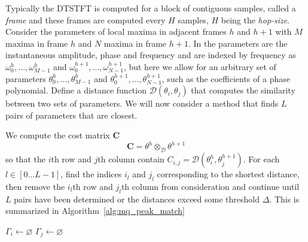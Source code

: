 Typically the DTSTFT is computed for a block of contiguous samples, called a
\textit{frame} and these frames are computed every $H$ samples, $H$ being the
\textit{hop-size}. Consider the parameters of local maxima in adjacent frames
$h$ and $h+1$ with $M$ maxima in frame $h$ and $N$ maxima in frame $h+1$. In
\cite{mcaulay1986speech}  the parameters are the instantaneous amplitude, phase
and frequency and are indexed by frequency as $\omega_0^{h}, \dotsc,
\omega_{M-1}^{h}$ and $\omega_0^{h+1}, \dotsc, \omega_{N-1}^{h+1}$, but here we
allow for an arbitrary set of parameters $\theta_0^{h}, \dotsc,
\theta_{M-1}^{h}$ and $\theta_0^{h+1}, \dotsc,
\theta_{N-1}^{h+1}$, such as the coefficients of a phase polynomial. Define a
distance function $\mathcal{D} \left( \theta_{i},\theta_{j} \right)$ that computes the
similarity between two sets of parameters. We will now consider a method that
finds $L$ pairs of parameters that are closest.

We compute the cost matrix $\boldsymbol{C}$
\[
    \boldsymbol{C} = \theta^{h} \otimes_{\mathcal{D}} \theta^{h+1}
\]
so that the $i$th row and $j$th column contain $C_{i,j} = \mathcal{D} \left(
\theta_{i}^{h},\theta_{j}^{h+1} \right)$.  For each $l \in \left[0 \dotsc L-1
\right]$, find the indices $i_{l}$ and $j_{l}$ corresponding to the shortest
distance, then remove the $i_{l}$th row and $j_{l}$th column from consideration
and continue until $L$ pairs have been determined or the distances exceed some
threshold $\Delta$. This is summarized in Algorithm~\ref{alg:mq_peak_match}

\begin{algorithm}[H]
    \caption{\label{alg:mq_peak_match}}
    $\Gamma_{i} \leftarrow \varnothing$\;
    $\Gamma_{j} \leftarrow \varnothing$\;
\end{algorithm}

